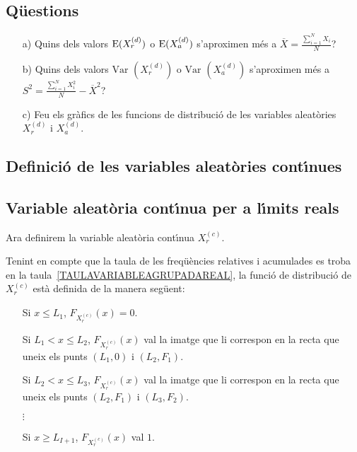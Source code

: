 \subsection*{Q\"uestions}
\begin{itemize}
\item[a)] Quins dels valors ${\rm E} (X_r^{(d)})$ o ${\rm E} (X_a^{(d)})$ s'aproximen
m\'es a $\overline{X}=\frac{\sum\limits_{i=1}^N X_i}{N}$?

\item[b)] Quins dels valors $\mbox{Var }(X_r^{(d)})$ o $\mbox{Var }
(X_a^{(d)})$ s'aproximen m\'es a \break
$S^2 =\frac{\sum\limits_{i=1}^N X_i^2}{N}-
\overline{X}^2$?

\item[c)] Feu els gr\`afics de les funcions de distribuci\'o
 de les variables
aleat\`ories 
$X_r^{(d)}$ i $X_a^{(d)}$.
\end{itemize}

\subsection{Definici\'o de les variables aleat\`ories
cont\'{\i}nues}

\subsection*{Variable aleat\`oria
cont\'{\i}nua per a l\'{\i}mits reals}

Ara definirem la variable aleat\`oria cont\'{\i}nua
 $X_r^{(c)}$.

Tenint en compte que la taula de les freq\"u\`encies relatives i 
acumulades es troba en la 
taula~\ref{TAULAVARIABLEAGRUPADAREAL}, la
funci\'o de distribuci\'o de 
$X_r^{(c)}$ est\`a definida de la 
manera seg\"uent:

\begin{itemize}
\item[] Si $x\leq L_1$, $F_{X_r^{(c)}}(x)=0$.

\item[] Si $L_1 < x\leq L_2$, $F_{X_r^{(c)}}(x)$ val la imatge que li 
correspon en la recta que uneix els punts $(L_1,0)$ i $(L_2,F_1)$.

\item[] Si $L_2 <x \leq L_3$, $F_{X_r^{(c)}}(x)$ val la imatge que li
correspon en la recta que uneix els punts $(L_2,F_1)$ i $(L_3,F_2)$.

\item[] $\vdots$

\item[] Si $x\geq L_{I+1}$, $F_{X_r^{(c)}}(x)$ val $1$.

\end{itemize}

